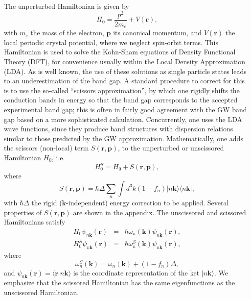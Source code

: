 \documentclass[floatfix,prb,aps,superscriptaddress,11pt]{revtex4}
\begin{document}
The unperturbed Hamiltonian is given by 
\begin{equation}\label{h0}
H_{0}=\frac{p^{2}}{2m_e}+V(\mathbf{r}),
\end{equation}
with $m_e$ the mass of the electron, $\mathbf{p}$ its canonical momentum, and 
$V(\mathbf{r})$ the local periodic crystal potential, where we neglect spin-orbit terms.
This Hamiltonian is used to solve the Kohn-Sham equations\cite{kohnPR65} of Density 
Functional Theory (DFT), for convenience usually within the Local
Density Approximation (LDA).
As is well known, the use of these solutions as single 
particle states leads to an underestimation of the band gap. A standard
procedure to correct for this is to
use the so-called ``scissors approximation'', by which one rigidly shifts the
conduction bands in energy so that the band gap corresponds to the accepted
experimental band gap; this is often in fairly good agreement with the GW
band gap based on a more sophisticated calculation.\cite{hybertsenPRB86}
Concurrently, one uses the LDA wave functions, since they produce band
structures with dispersion relations similar to those predicted by the GW
approximation. Mathematically, one adds the scissors (non-local) term 
$S(\mathbf{r},\mathbf{p})$, to the unperturbed or unscissored Hamiltonian $H_{0}$, i.e. 
\begin{equation*}
H_{0}^{S}=H_{0}+S(\mathbf{r},\mathbf{p}),
\end{equation*}
where 
\begin{equation}
S(\mathbf{r},\mathbf{p})=\hbar \Delta\sum_{n}\int d^{3}k(1-f_{n})
|n\mathbf{k}\rangle\langle n\mathbf{k}|,
\label{hats}
\end{equation}
with $\hbar \Delta$  the rigid ($\mathbf{k}$-independent) energy correction to be
applied. 
Several properties of $S(\mathbf{r},\mathbf{p})$ are shown in the
appendix.
The unscissored and scissored Hamiltonians satisfy 
\begin{eqnarray*}
H_{0}\psi _{n\mathbf{k}}(\mathbf{r}) &=&\hbar \omega_{n}(\mathbf{k})\psi _{n\mathbf{k}}(\mathbf{r}),
\label{hamils} \\
H_{0}^{S}\psi _{n\mathbf{k}}(\mathbf{r}) &=&\hbar \omega_{n}^{S}(\mathbf{k})\psi _{n\mathbf{k}}(\mathbf{r}),
\end{eqnarray*}
where 
\begin{equation}
\omega_{n}^{S}(\mathbf{k})=\omega_{n}(\mathbf{k})+(1-f_{n})\Delta,  
\label{wese}
\end{equation}
and $\psi _{n\mathbf{k}}(\mathbf{r})=\langle\mathbf{r} | n\mathbf{k}\rangle$ is the coordinate
representation of the ket $|n\mathbf{k}\rangle$. We emphasize that the scissored
Hamiltonian has the same eigenfunctions as the unscissored Hamiltonian.
\end{document}
